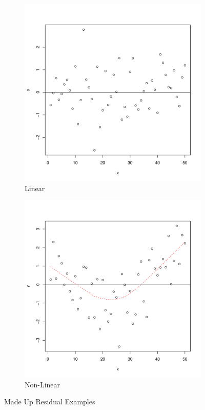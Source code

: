 \documentclass[11pt,openany]{book}\usepackage[]{graphicx}\usepackage[]{color}
\begin{document}
\begin{figure}
        \centering
        \begin{subfigure}[b]{0.45\textwidth}
                \centering
                \includegraphics[width=\textwidth]{15_Diagnostics/convar.pdf}%
                \caption{Linear \label{fig:convar2}}
        \end{subfigure}
        \begin{subfigure}[b]{0.45\textwidth}
                \centering
                \includegraphics[width=\textwidth]{15_Diagnostics/nonlin.pdf}
                \caption{Non-Linear \label{fig:nonlin}}
        \end{subfigure}
        \caption{Made Up Residual Examples}
\end{figure} 
\end{document}
